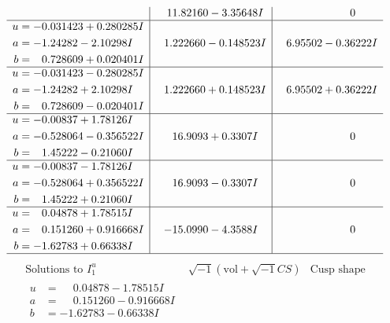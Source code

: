 \documentclass[1p]{elsarticle_modified}
\theoremstyle{definition}
\newcommand{\I}{\sqrt{-1}}
\begin{document}
$$\begin{array}{c|c|c}
 & \phantom{-}11.82160 - 3.35648 I & \phantom{-0.000000 } 0 \\ \hline\begin{aligned}
u &= -0.031423 + 0.280285 I \\
a &= -1.24282 - 2.10298 I \\
b &= \phantom{-}0.728609 + 0.020401 I\end{aligned}
 & \phantom{-}1.222660 - 0.148523 I & \phantom{-}6.95502 - 0.36222 I \\ \hline\begin{aligned}
u &= -0.031423 - 0.280285 I \\
a &= -1.24282 + 2.10298 I \\
b &= \phantom{-}0.728609 - 0.020401 I\end{aligned}
 & \phantom{-}1.222660 + 0.148523 I & \phantom{-}6.95502 + 0.36222 I \\ \hline\begin{aligned}
u &= -0.00837 + 1.78126 I \\
a &= -0.528064 - 0.356522 I \\
b &= \phantom{-}1.45222 - 0.21060 I\end{aligned}
 & \phantom{-}16.9093 + 0.3307 I & \phantom{-0.000000 } 0 \\ \hline\begin{aligned}
u &= -0.00837 - 1.78126 I \\
a &= -0.528064 + 0.356522 I \\
b &= \phantom{-}1.45222 + 0.21060 I\end{aligned}
 & \phantom{-}16.9093 - 0.3307 I & \phantom{-0.000000 } 0 \\ \hline\begin{aligned}
u &= \phantom{-}0.04878 + 1.78515 I \\
a &= \phantom{-}0.151260 + 0.916668 I \\
b &= -1.62783 + 0.66338 I\end{aligned}
 & -15.0990 - 4.3588 I & \phantom{-0.000000 } 0\\
 \hline 
 \end{array}$$\newpage$$\begin{array}{c|c|c}  
\text{Solutions to }I^u_{1}& \I (\text{vol} + \sqrt{-1}CS) & \text{Cusp shape}\\
 \hline 
\begin{aligned}
u &= \phantom{-}0.04878 - 1.78515 I \\
a &= \phantom{-}0.151260 - 0.916668 I \\
b &= -1.62783 - 0.66338 I\end{aligned}

\end{array}$$
\end{document}
